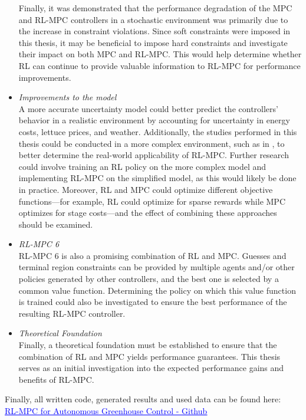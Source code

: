 \begin{itemize}
	Finally, it was demonstrated that the performance degradation of the MPC and RL-MPC controllers in a stochastic environment was primarily due to the increase in constraint violations. Since soft constraints were imposed in this thesis, it may be beneficial to impose hard constraints and investigate their impact on both MPC and RL-MPC. This would help determine whether RL can continue to provide valuable information to RL-MPC for performance improvements.
	
	
	\item \textit{Improvements to the model}
	\\A more accurate uncertainty model could better predict the controllers' behavior in a realistic environment by accounting for uncertainty in energy costs, lettuce prices, and weather. Additionally, the studies performed in this thesis could be conducted in a more complex environment, such as in \citet{GreenLightOpenSource2020}, to better determine the real-world applicability of RL-MPC. Further research could involve training an RL policy on the more complex model and implementing RL-MPC on the simplified model, as this would likely be done in practice. Moreover, RL and MPC could optimize different objective functions—for example, RL could optimize for sparse rewards while MPC optimizes for stage costs—and the effect of combining these approaches should be examined.
	
	\item \textit{RL-MPC 6}
	\\RL-MPC 6 is also a promising combination of RL and MPC. Guesses and terminal region constraints can be provided by multiple agents and/or other policies generated by other controllers, and the best one is selected by a common value function. Determining the policy on which this value function is trained could also be investigated to ensure the best performance of the resulting RL-MPC controller.
	
	\item \textit{Theoretical Foundation}
	\\Finally, a theoretical foundation must be established to ensure that the combination of RL and MPC yields performance guarantees. This thesis serves as an initial investigation into the expected performance gains and benefits of RL-MPC.
\end{itemize}

Finally, all written code, generated results and used data can be found here:\\
\href{https://github.com/mharraway/RL-MPC-for-autonomous-greenhouse-control}{\textcolor{blue}{\underline{RL-MPC for Autonomous Greenhouse Control - Github}}}







